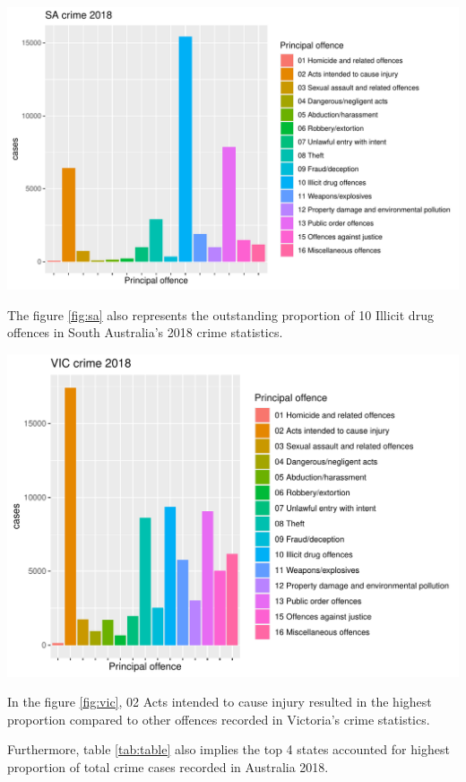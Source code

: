 \documentclass[11pt,a4paper,]{article}
\let\origfigure\figure
\let\endorigfigure\endfigure
\renewenvironment{figure}[1][2] {
\expandafter\origfigure\expandafter[H]
} {
\endorigfigure
}
\begin{document}
\begin{figure}
\centering
\includegraphics{ETC5513-Assignment4_files/figure-latex/sa-1.pdf}
\caption{\label{fig:sa}SA crime 2018}
\end{figure}

The figure \ref{fig:sa} also represents the outstanding proportion of 10 Illicit drug offences in South Australia's 2018 crime statistics.

\begin{figure}
\centering
\includegraphics{ETC5513-Assignment4_files/figure-latex/vic-1.pdf}
\caption{\label{fig:vic}VIC crime 2018}
\end{figure}

In the figure \ref{fig:vic}, 02 Acts intended to cause injury resulted in the highest proportion compared to other offences recorded in Victoria's crime statistics.

Furthermore, table \ref{tab:table} also implies the top 4 states accounted for highest proportion of total crime cases recorded in Australia 2018.
\end{document}
